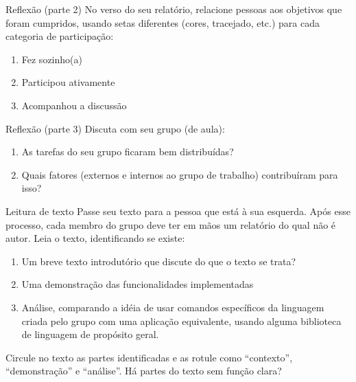 \documentclass{beamer}
\begin{document}
\begin{frame}[fragile]{Reflexão (parte 2)}
  \centering
  \Large
  No verso do seu relatório, relacione pessoas aos objetivos que foram
  cumpridos, usando setas diferentes (cores, tracejado, etc.) para cada
  categoria de participação:
  \begin{enumerate}
    \item Fez sozinho(a)
    \item Participou ativamente
    \item Acompanhou a discussão
  \end{enumerate}

\end{frame}


\begin{frame}[fragile]{Reflexão (parte 3)}
  \centering
  \Large
  Discuta com seu grupo (de aula):
  \begin{enumerate}
    \item As tarefas do seu grupo ficaram bem distribuídas?
    \item Quais fatores (externos e internos ao grupo de trabalho) contribuíram
        para isso?
  \end{enumerate}
\end{frame}

\begin{frame}[fragile]{Leitura de texto}
  \centering
  \large
  Passe seu texto para a pessoa que está à sua esquerda. Após esse processo,
  cada membro do grupo deve ter em mãos um relatório do qual não é autor. Leia o
  texto, identificando se existe:
  \begin{enumerate}
  \item Um breve texto introdutório que discute do que o texto se trata?
  \item Uma demonstração das funcionalidades implementadas
  \item Análise, comparando a idéia de usar comandos específicos da linguagem
    criada pelo grupo com uma  aplicação equivalente, usando alguma biblioteca
      de linguagem de propósito geral.
  \end{enumerate}

  Circule no texto as partes identificadas e as rotule como ``contexto'',
  ``demonstração'' e ``análise''. Há partes do texto sem função clara?
\end{frame}
\end{document}
